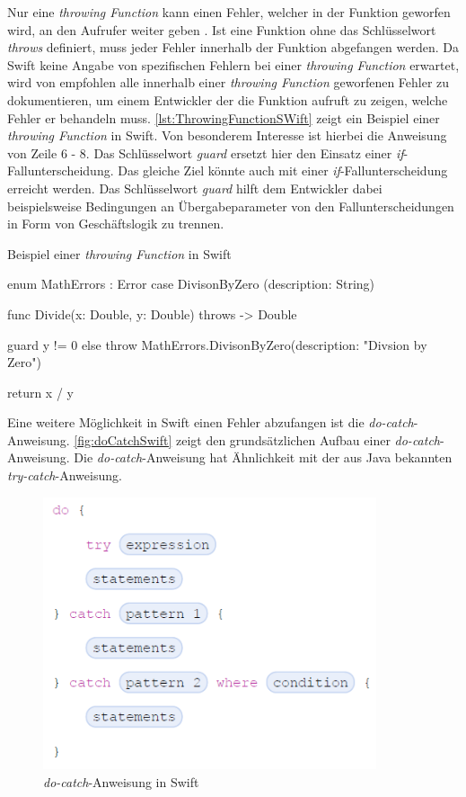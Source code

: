Nur eine \textit{throwing Function} kann einen Fehler, welcher in der Funktion geworfen wird, an den Aufrufer weiter geben \cite[S.311]{Apple.2017}.
Ist eine Funktion ohne das Schlüsselwort \textit{throws} definiert, muss jeder Fehler innerhalb der Funktion abgefangen werden.
Da Swift keine Angabe von spezifischen Fehlern bei einer \textit{throwing Function} erwartet, wird von \cite[S.176]{Hoffman.2017} empfohlen alle innerhalb einer \textit{throwing Function} geworfenen Fehler zu dokumentieren, um einem Entwickler der die Funktion aufruft zu zeigen, welche Fehler er behandeln muss.
\autoref{lst:ThrowingFunctionSWift} zeigt ein Beispiel einer \textit{throwing Function} in Swift. 
Von besonderem Interesse ist hierbei die Anweisung von Zeile 6 - 8. 
Das Schlüsselwort \textit{guard} ersetzt hier den Einsatz einer \textit{if}-Fallunterscheidung.
Das gleiche Ziel könnte auch mit einer \textit{if}-Fallunterscheidung erreicht werden.
Das Schlüsselwort \textit{guard} hilft dem Entwickler dabei beispielsweise Bedingungen an Übergabeparameter von den Fallunterscheidungen in Form von Geschäftslogik  zu trennen. 

\begin{listing}
\caption{Beispiel einer \textit{throwing Function} in Swift}
\label{lst:ThrowingFunctionSWift}
\begin{SwiftCode}
enum MathErrors : Error{
    case DivisonByZero (description: String)
}

func Divide(x: Double, y: Double) throws -> Double {
    guard y != 0 else {
        throw MathErrors.DivisonByZero(description: "Divsion by Zero")
    }
	
    return x / y
}
\end{SwiftCode}
\end{listing}

Eine weitere Möglichkeit in Swift einen Fehler abzufangen ist die \textit{do-catch}-Anweisung. 
\autoref{fig:doCatchSwift} zeigt den grundsätzlichen Aufbau einer \textit{do-catch}-Anweisung.
Die \textit{do-catch}-Anweisung hat Ähnlichkeit mit der aus Java bekannten \textit{try-catch}-Anweisung.

\begin{figure}[H]
    \centering
    \includegraphics[height=8cm]{Images/doCatch.png}
    \caption{\textit{do-catch}-Anweisung in Swift \cite[S.314]{Apple.2017}}
    \label{fig:doCatchSwift}
\end{figure}

